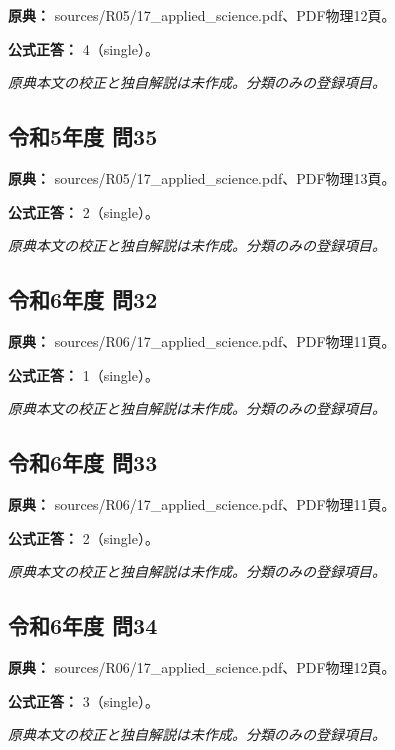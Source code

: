 \noindent\textbf{原典：} sources/R05/17\_applied\_science.pdf、PDF物理12頁。

\textbf{公式正答：} 4（single）。

\par\textit{原典本文の校正と独自解説は未作成。分類のみの登録項目。}

\subsection{令和5年度 問35}
\label{q:r05-reg-applied-35}

\noindent\textbf{原典：} sources/R05/17\_applied\_science.pdf、PDF物理13頁。

\textbf{公式正答：} 2（single）。

\par\textit{原典本文の校正と独自解説は未作成。分類のみの登録項目。}

\subsection{令和6年度 問32}
\label{q:r06-reg-applied-32}

\noindent\textbf{原典：} sources/R06/17\_applied\_science.pdf、PDF物理11頁。

\textbf{公式正答：} 1（single）。

\par\textit{原典本文の校正と独自解説は未作成。分類のみの登録項目。}

\subsection{令和6年度 問33}
\label{q:r06-reg-applied-33}

\noindent\textbf{原典：} sources/R06/17\_applied\_science.pdf、PDF物理11頁。

\textbf{公式正答：} 2（single）。

\par\textit{原典本文の校正と独自解説は未作成。分類のみの登録項目。}

\subsection{令和6年度 問34}
\label{q:r06-reg-applied-34}

\noindent\textbf{原典：} sources/R06/17\_applied\_science.pdf、PDF物理12頁。

\textbf{公式正答：} 3（single）。

\par\textit{原典本文の校正と独自解説は未作成。分類のみの登録項目。}

